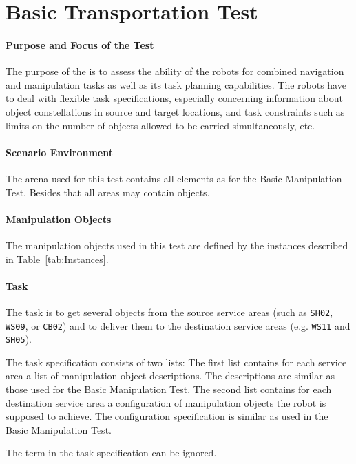 \newpage
\section{Basic Transportation Test}

\paragraph{Purpose and Focus of the Test}
The purpose of the  is to assess the ability of the robots for combined navigation and manipulation tasks as well as its task planning capabilities.
The robots have to deal with flexible task specifications, especially concerning information about object constellations in source and target locations, and task constraints such as limits on the number of objects allowed to be carried simultaneously, etc.

\paragraph{Scenario Environment}
The arena used for this test contains all elements as for the Basic Manipulation Test. Besides that all areas may contain objects.

\paragraph{Manipulation Objects}
The manipulation objects used in this test are defined by the instances described in Table~\ref{tab:Instances}.

\paragraph{Task}
The task is to get several objects from the source service areas (such as \texttt{SH02}, \texttt{WS09}, or \texttt{CB02}) and to deliver them to the destination service areas (e.g. \texttt{WS11} and \texttt{SH05}). 
\par
The task specification consists of two lists: The first list contains for each service area a list of manipulation object descriptions. The descriptions are similar as those used for the Basic Manipulation Test. The second list contains for each destination service area a configuration of manipulation objects the robot is supposed to achieve. The configuration specification is similar as used in the Basic Manipulation Test. 

The term  in the task specification can be ignored.

